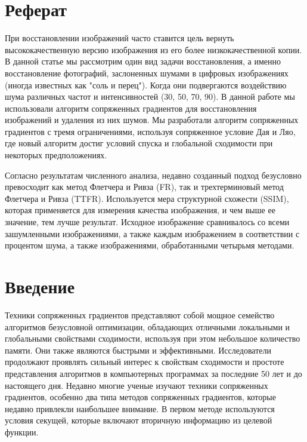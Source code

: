 



\makeatletter
\newcommand{\stackover}{\genfrac{.}{.}\z@{}}
\makeatother




\tableofcontents
\newpage

\section*{Реферат}

При восстановлении изображений часто ставится цель вернуть высококачественную
версию изображения из его более низкокачественной копии. В данной статье мы
рассмотрим один вид задачи восстановления, а именно восстановление фотографий,
заслоненных шумами в цифровых изображениях (иногда известных как "соль и
перец"). Когда они подвергаются воздействию шума различных частот и
интенсивностей (30, 50, 70, 90). В данной работе мы использовали алгоритм
сопряженных градиентов для восстановления изображений и удаления из них шумов.
Мы разработали алгоритм сопряженных градиентов с тремя ограничениями, используя
сопряженное условие Дая и Ляо, где новый алгоритм достиг условий спуска и
глобальной сходимости при некоторых предположениях.

Согласно результатам численного анализа, недавно созданный подход безусловно
превосходит как метод Флетчера и Ривза (FR), так и трехтерминовый метод Флетчера
и Ривза (TTFR). Используется мера структурной схожести (SSIM), которая
применяется для измерения качества изображения, и чем выше ее значение, тем
лучше результат. Исходное изображение сравнивалось со всеми зашумленными
изображениями, а также каждым изображением в соответствии с процентом шума, а
также изображениями, обработанными четырьмя методами.

\section{Введение}

Техники сопряженных градиентов представляют собой мощное семейство алгоритмов
безусловной оптимизации, обладающих отличными локальными и глобальными
свойствами сходимости, используя при этом небольшое количество памяти. Они также
являются быстрыми и эффективными. Исследователи продолжают проявлять сильный
интерес к свойствам сходимости и простоте представления алгоритмов в
компьютерных программах за последние 50 лет и до настоящего дня. Недавно многие
ученые изучают техники сопряженных градиентов, особенно два типа методов
сопряженных градиентов, которые недавно привлекли наибольшее внимание. В первом
методе используются условия секущей, которые включают вторичную информацию из
целевой функции.

